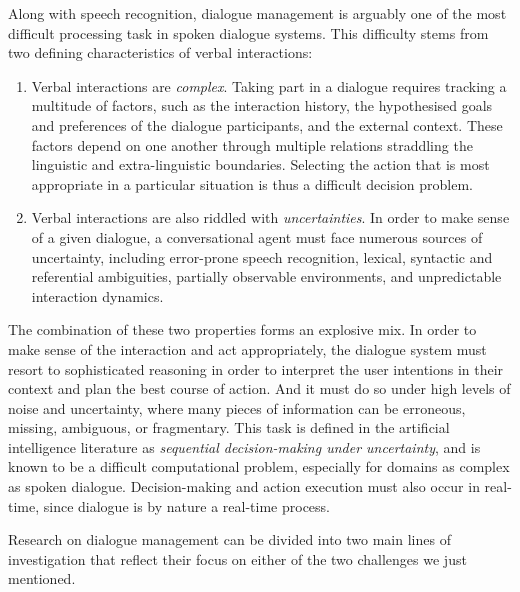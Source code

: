 Along with speech recognition, dialogue management is arguably one of the most difficult processing task in spoken dialogue systems. This difficulty stems from two defining characteristics of verbal interactions:
\begin{enumerate}
\item Verbal interactions are \textit{complex}.   Taking part in a dialogue requires tracking a multitude of factors, such as the interaction history, the hypothesised goals and preferences of the dialogue participants, and the external context. These factors depend on one another through multiple relations straddling the linguistic and extra-linguistic boundaries.  Selecting the action that is most appropriate in a particular situation is thus a difficult decision problem. 

\item Verbal interactions are also riddled with \textit{uncertainties}.  In order to make sense of a given dialogue, a conversational agent must face numerous sources of uncertainty, including error-prone speech recognition, lexical,  syntactic and referential ambiguities, partially observable environments, and unpredictable interaction dynamics.  
\end{enumerate} 

The combination of these two properties forms an explosive mix.  In order to make sense of the interaction and act appropriately, the dialogue system must resort to sophisticated reasoning in order to interpret the user intentions in their context and plan the best course of action.  And it must do so under high levels of noise and uncertainty, where many pieces of information can be erroneous, missing, ambiguous, or fragmentary. This task is defined in the artificial intelligence literature as \textit{sequential decision-making under uncertainty}, and is known to be a difficult computational problem, especially for domains as complex as spoken dialogue. Decision-making and action execution must also occur in real-time, since dialogue is by nature a real-time process. 


Research on dialogue management can be divided into two main lines of investigation that reflect their focus on either of the two challenges we just mentioned.  


